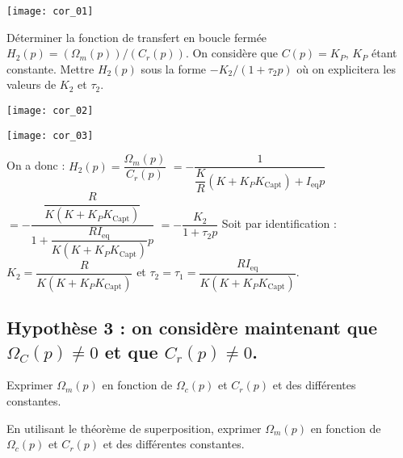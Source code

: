 \ifprof
\begin{corrige}
\begin{center}
\texttt{[image: cor\_01]}
\end{center}
\end{corrige}
\else
\fi


\begin{question}
Déterminer la fonction de transfert en boucle fermée $H_2 (p)=(\Omega_m (p))/(C_r (p))$. On considère que $C(p)=K_P$, $K_P$ étant constante. Mettre $H_2 (p)$ sous la forme $-K_2/(1+\tau_2 p)$ où on explicitera les valeurs de $K_2$ et $\tau_2$.
\end{question}

\ifprof
\begin{corrige}
\begin{center}
\texttt{[image: cor\_02]}
\end{center}
\begin{center}
\texttt{[image: cor\_03]}
\end{center}
On a donc :	
$H_2 (p)=\dfrac{\Omega_m (p)}{C_r (p)}$
$=-\dfrac{1}{\dfrac{K}{R} \left(K+K_P K_{\text{Capt}} \right)+I_{\text{eq}} p}$
$=-\dfrac{\dfrac{R}{K \left(K+K_P  K_{\text{Capt}} \right) }}{1+\dfrac{R I_{\text{eq}}}{K \left(K+K_P K_{\text{Capt}} \right) } p}$
$=-\dfrac{K_2}{1+\tau_2 p}$
Soit par identification : $K_2=\dfrac{R}{K \left(K+K_P  K_{\text{Capt}} \right) }$	et	$\tau_2=\tau_1=\dfrac{R I_{\text{eq}}}{K (K+K_P K_{\text{Capt}} ) }$.





\end{corrige}
\else
\fi


\subsection*{Hypothèse 3 : on considère maintenant que  $\Omega_C (p)\neq 0$ et que $C_r (p)\neq 0$.}
\else
\fi

\begin{question}
Exprimer $\Omega_m (p)$ en fonction de $\Omega_c (p)$ et $C_r (p)$ et des différentes constantes.
\end{question}


\ifprof
\begin{question}
En utilisant le théorème de superposition, exprimer $\Omega_m (p)$ en fonction de $\Omega_c (p)$ et $C_r (p)$ et des différentes constantes.
\end{question}

